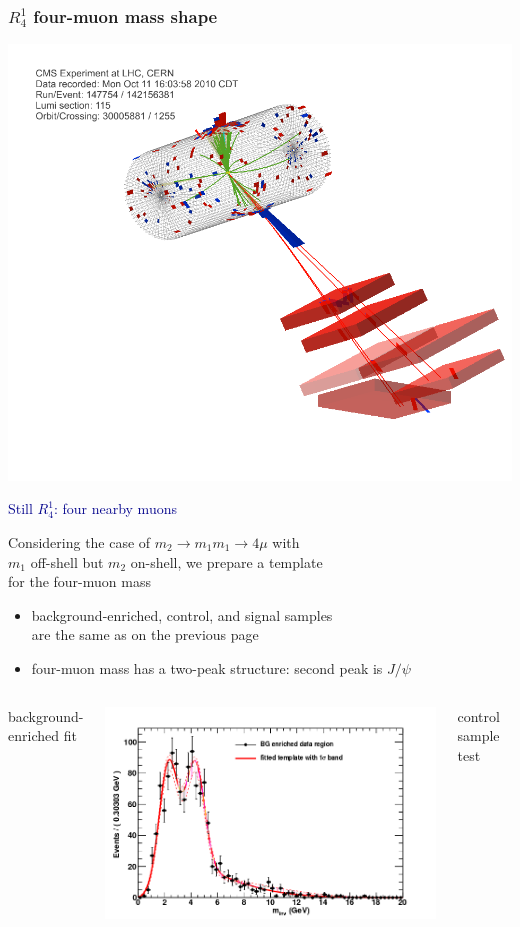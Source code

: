 \documentclass[compress]{beamer}
\begin{document}
\begin{frame}
\frametitle{$R^1_4$ four-muon mass shape}

\hfill \includegraphics[height=3 cm]{quadmu_control_eventdisplay.png}

\vspace{-3 cm}
\textcolor{darkblue}{Still $R^1_4$: four nearby muons}

\vspace{0.25 cm}
Considering the case of $m_2 \to m_1 m_1 \to 4\mu$ with \\ $m_1$
off-shell but $m_2$ on-shell, we prepare a template \\ for the four-muon mass

\begin{itemize}
\item background-enriched, control, and signal samples \\ are the same as on the previous page
\item four-muon mass has a two-peak structure: second peak is $J/\psi$
\end{itemize}

\begin{columns}
\centering background-enriched fit

\includegraphics[width=\linewidth]{template__bkg_model_a2_inv__m_inv.png}

\centering control sample test


\end{columns}
\end{frame}
\end{document}
